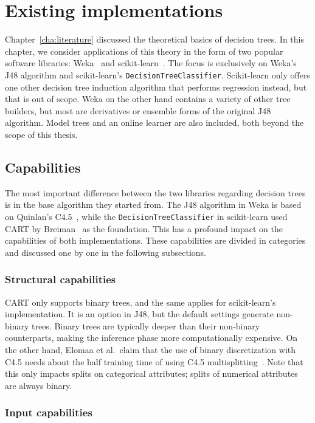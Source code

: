 \chapter{Existing implementations}\label{cha:software}
Chapter~\ref{cha:literature} discussed the theoretical basics of decision trees. In this chapter, we consider applications of this theory in the form of two popular software libraries: Weka~\cite{eibe2016weka} and scikit-learn~\cite{scikit-learn}. The focus is exclusively on Weka's J48 algorithm and scikit-learn's \texttt{DecisionTreeClassifier}. Scikit-learn only offers one other decision tree induction algorithm that performs regression instead, but that is out of scope. Weka on the other hand contains a variety of other tree builders, but most are derivatives or ensemble forms of the original J48 algorithm. Model trees and an online learner are also included, both beyond the scope of this thesis.

\section{Capabilities}
The most important difference between the two libraries regarding decision trees is in the base algorithm they started from. The J48 algorithm in Weka is based on Quinlan's C4.5~\cite{c45}, while the \texttt{DecisionTreeClassifier} in scikit-learn used CART by Breiman~\cite{cart} as the foundation. This has a profound impact on the capabilities of both implementations. These capabilities are divided in categories and discussed one by one in the following subsections.

\subsection{Structural capabilities}
CART only supports binary trees, and the same applies for scikit-learn's implementation. It is an option in J48, but the default settings generate non-binary trees. Binary trees are typically deeper than their non-binary counterparts, making the inference phase more computationally expensive. On the other hand, Elomaa et al.\ claim that the use of binary discretization with C4.5 needs about the half training time of using C4.5 multisplitting~\cite{elomaa1999general}. Note that this only impacts splits on categorical attributes; splits of numerical attributes are always binary.

\subsection{Input capabilities}
